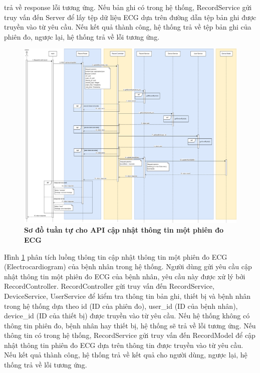 trả về response lỗi tương ứng. Nếu bản ghi có trong hệ thống, RecordService gửi truy vấn đến Server để lấy tệp dữ liệu ECG dựa trên đường dẫn tệp bản ghi được truyền vào từ yêu cầu. 
Nếu kết quả thành công, hệ thống trả về tệp bản ghi của phiên đo, ngược lại, hệ thống trả về lỗi tương ứng.
 \begin{figure}[H]
  \centering
  \includegraphics[scale=0.25]{Images/sequence_api/editRecordById.png}
  \caption[Sơ đồ tuần tự cho API cập nhật thông tin một phiên đo ECG ]{\bfseries \fontsize{12pt}{0pt}
  \selectfont Sơ đồ tuần tự cho API cập nhật thông tin một phiên đo ECG }
  \label{api_editRecordById} %
\end{figure}
Hình \ref{api_editRecordById} phân tích luồng thông tin cập nhật thông tin một phiên đo ECG (Electrocardiogram) của bệnh nhân trong hệ thống. Người dùng gửi yêu cầu cập nhật thông tin một phiên đo ECG của bệnh nhân, 
yêu cầu này được xử lý bởi RecordController. RecordController gửi truy vấn đến RecordService, DeviceService, UserService để kiểm tra thông tin bản ghi, thiết bị và bệnh nhân trong hệ thống dựa theo id (ID của phiên đo), user\_id (ID của bệnh nhân), device\_id (ID của thiết bị)
 được truyền vào từ yêu cầu. Nếu hệ thống không có thông tin phiên đo, bệnh nhân hay thiết bị, hệ thống sẽ trả về lỗi tương ứng. Nếu thông tin có trong hệ thống, RecordService gửi truy vấn đến RecordModel để cập nhật thông tin
phiên đo ECG dựa trên thông tin được truyền vào từ yêu cầu. Nếu kết quả thành công, hệ thống trả về kết quả cho người dùng, ngược lại, hệ thống trả về lỗi tương ứng.

